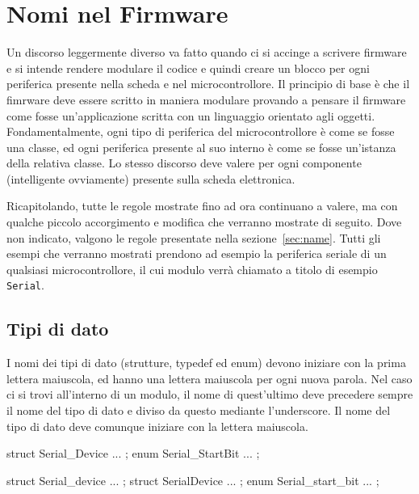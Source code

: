 %

\section{Nomi nel Firmware}\label{sec:firmware}

Un discorso leggermente diverso va fatto quando ci si accinge a scrivere firmware e si intende rendere modulare il codice e quindi creare un blocco per ogni periferica presente nella scheda e nel microcontrollore.
Il principio di base è che il fimrware deve essere scritto in maniera modulare provando a pensare il firmware come fosse un'applicazione scritta con un linguaggio orientato agli oggetti.
Fondamentalmente, ogni tipo di periferica del microcontrollore è come se fosse una classe, ed ogni periferica presente al suo interno è come se fosse un'istanza della relativa classe.
Lo stesso discorso deve valere per ogni componente (intelligente ovviamente) presente sulla scheda elettronica.

Ricapitolando, tutte le regole mostrate fino ad ora continuano a valere, ma con qualche piccolo accorgimento e modifica che verranno mostrate di seguito.
Dove non indicato, valgono le regole presentate nella sezione~\ref{sec:name}.
Tutti gli esempi che verranno mostrati prendono ad esempio la periferica seriale di un qualsiasi microcontrollore, il cui modulo verrà chiamato a titolo di esempio \texttt{Serial}.

\subsection{Tipi di dato}\label{ssec:etypename}

I nomi dei tipi di dato (strutture, typedef ed enum) devono iniziare con la prima lettera maiuscola, ed hanno una lettera maiuscola per ogni nuova parola\cite{codestyle:camel}.
Nel caso ci si trovi all'interno di un modulo, il nome di quest'ultimo deve precedere sempre il nome del tipo di dato e diviso da questo mediante l'underscore.
Il nome del tipo di dato deve comunque iniziare con la lettera maiuscola.

\noindent\begin{minipage}[t]{\cbwidth}
\begin{RightCode}
struct Serial_Device { ... };
enum Serial_StartBit { ... };
\end{RightCode}
\end{minipage}%
\hspace{\cbdistance}
\begin{minipage}[t]{\cbwidth}
\begin{ErrorCode}
struct Serial_device { ... };
struct SerialDevice { ... };
enum Serial_start_bit { ... };
\end{ErrorCode}
\end{minipage}


